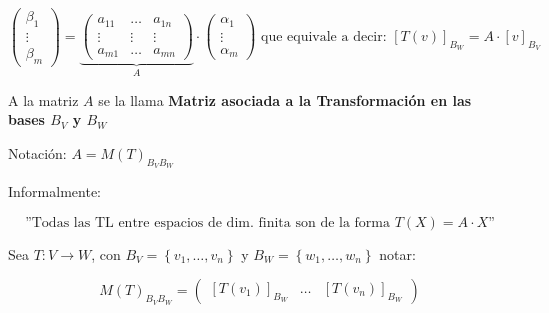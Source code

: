 \[
    \begin{pmatrix} \beta_1 \\ \vdots \\ \beta_m \end{pmatrix} =
    \underbrace{\begin{pmatrix} a_{11} & \dots & a_{1n} \\
            \vdots & \vdots & \vdots \\
            a_{m1} & \dots & a_{mn}
        \end{pmatrix}}_{A} \cdot \begin{pmatrix} 
    \alpha_1 \\ \vdots \\ \alpha_m \end{pmatrix} \text{ que equivale a decir: } \left[T(v)\right]_{B_W} = A \cdot \left[v\right]_{B_V}\]


A la matriz $ A $ se la llama \textbf{Matriz asociada a la Transformación en las bases $ B_V $ y $ B_W $}

Notación: $ A = M(T)_{B_VB_W} $

Informalmente:

\[
    \text{''Todas las TL entre espacios de dim. finita son de la forma $T(X) = A \cdot X$''}
\]

Sea $ T :V \to W $, con $ B_V = \left\{ v_1, \dots, v_n \right\}$ y  $ B_W = \left\{ w_1, \dots, w_n \right\}$ notar:

\[
    M(T)_{B_VB_W} = \begin{pmatrix} \left[T(v_1)\right]_{B_W} & \dots & \left[T(v_n)\right]_{B_W} \end{pmatrix}
\]
